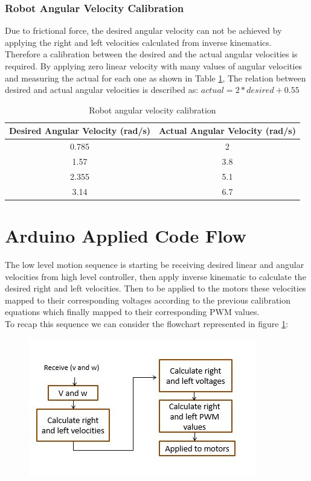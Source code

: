 \subsubsection{Robot Angular Velocity Calibration}
\hspace{2cm}Due to frictional force, the desired angular velocity can not be achieved by applying the right and left velocities calculated from inverse kinematics. Therefore a calibration between the desired and the actual angular velocities is required. By applying zero linear velocity with many values of angular velocities and measuring the actual for each one as shown in Table \ref{table:angular_calibration}, The relation between desired and actual angular velocities is described as: \(actual =  2 * desired + 0.55\)
\begin{table}[h!]
\centering
\begin{tabular}{|c|c|}
 \hline
 Desired Angular Velocity (rad/s) &Actual Angular Velocity (rad/s)\\ [0.5ex] 
 \hline\hline
 
0.785 & 2\\
1.57 & 3.8\\
2.355 & 5.1\\
3.14 & 6.7\\
[1ex] 
 \hline
\end{tabular}
\caption[Robot Angular Velocity Calibration]{Robot angular velocity calibration}
\label{table:angular_calibration}
\end{table}

\section{Arduino Applied Code Flow}
\hspace{2cm}The low level motion sequence is starting be receiving desired linear and angular velocities from high level controller, then apply inverse kinematic to calculate the desired right and left velocities. Then to be applied to the motors these velocities mapped to their corresponding voltages according to the previous calibration equations which finally mapped to their corresponding PWM values.\\
To recap this sequence we can consider the flowchart represented in figure \ref{fig:arduino_code}:

  \begin{figure}[H]%
    \center%
    \includegraphics[width=.8\textwidth]{images/Alzahraa/flowchart.JPG}%
    \caption[Arduino Applied Code Flow]{}\label{fig:arduino_code}%
  \end{figure} 